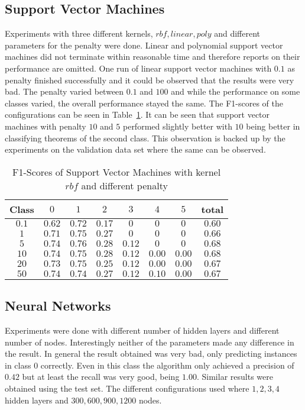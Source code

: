 \subsection{Support Vector Machines}
Experiments with three different kernels, $rbf,linear,poly$ and different parameters for the penalty were done. Linear and polynomial support vector machines did not terminate within reasonable time and therefore reports on their performance are omitted. One run of linear support vector machines with $0.1$ as penalty finished successfully and it could be observed that the results were very bad. The penalty varied between $0.1$ and $100$ and while the performance on some classes varied, the overall performance stayed the same. The F1-scores of the configurations can be seen in Table~\ref{ds2:table:svmf1}. It can be seen that support vector machines with penalty $10$ and $5$ performed slightly better with $10$ being better in classifying theorems of the second class. This observation is backed up by the experiments on the validation data set where the same can be observed.
\begin{table}[p]
	\begin{center}
		\begin{tabular}{|c|c|c|c|c|c|c|c|}
\hline Class & $0$ & $1$ & $2$ & $3$ &$4$  &$ 5$ & total \\
\hline $0.1$ & $0.62$ & $0.72$ & $0.17$ & $0$ & $0$ & $0$ & $0.60$ \\
\hline $1$ & $0.71$ & $0.75$ & $0.27$ & $0$ & $0$ & $0$ & $0.66$ \\
\hline $5$ & $0.74$ & $0.76$ &$0.28$ & $0.12$ & $0$ & $0$ & $0.68$ \\
\hline $10$ & $0.74$ & $0.75$ &$0.28$ & $0.12$ & $0.00$ &	$0.00$ & $0.68$ \\
\hline $20$ & $0.73$ & $0.75$ &$0.25$ & $0.12$ & $0.00$ & $0.00$ & $0.67$ \\
\hline $50$ & $0.74$ & $0.74$ &$0.27$ & $0.12$ & $0.10$ & $0.00$ & $0.67$ \\
\hline
	\end{tabular}
	\end{center}
	\caption{F1-Scores of Support Vector Machines with kernel $rbf$ and different penalty\label{ds2:table:svmf1}}
\end{table}

\subsection{Neural Networks}
Experiments were done with different number of hidden layers and different number of nodes. Interestingly neither of the parameters made any difference in the result. In general the result obtained was very bad, only predicting instances in class $0$ correctly. Even in this class the algorithm only achieved a precision of $0.42$ but at least the recall was very good, being $1.00$. Similar results were obtained using the test set. The different configurations used where $1,2,3,4$ hidden layers and $300,600,900,1200$ nodes. 
